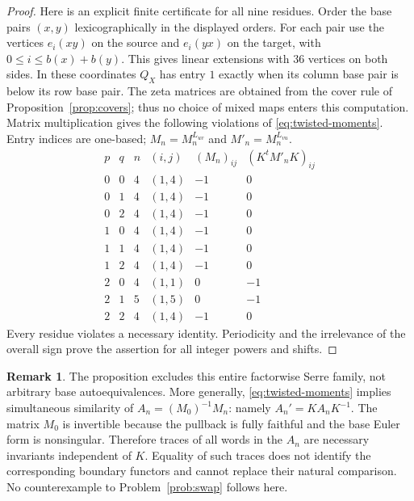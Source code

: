 \documentclass[11pt]{article}
\theoremstyle{definition}
\newtheorem{remark}[theorem]{Remark}
\begin{document}
\begin{proof}
Here is an explicit finite certificate for all nine residues.
Order the base pairs $(x,y)$ lexicographically in the displayed
orders. For each pair use the vertices $e_i(xy)$ on the source
and $e_i(yx)$ on the target, with
$0\leq i\leq b(x)+b(y)$. This gives linear extensions with $36$
vertices on both sides. In these coordinates $Q_X$ has entry $1$
exactly when its column base pair is below its row base pair.
The zeta matrices are obtained from the cover rule of
Proposition~\ref{prop:covers}; thus no choice of mixed maps enters
this computation. Matrix multiplication gives the following
violations of \eqref{eq:twisted-moments}. Entry indices are one-based;
$M_n=M_n^{L_{uv}}$ and $M'_n=M_n^{L_{vu}}$.
\[
\begin{array}{c|c|c|c|r|r}
 p&q&n&(i,j)&(M_n)_{ij}&(K^tM'_nK)_{ij}\\\hline
 0&0&4&(1,4)&-1&0\\
 0&1&4&(1,4)&-1&0\\
 0&2&4&(1,4)&-1&0\\
 1&0&4&(1,4)&-1&0\\
 1&1&4&(1,4)&-1&0\\
 1&2&4&(1,4)&-1&0\\
 2&0&4&(1,1)&0&-1\\
 2&1&5&(1,5)&0&-1\\
 2&2&4&(1,4)&-1&0
\end{array}
\]
Every residue violates a necessary identity. Periodicity and the
irrelevance of the overall sign prove the assertion for all
integer powers and shifts.
\end{proof}

\begin{remark}
The proposition excludes this entire factorwise Serre family,
not arbitrary base autoequivalences. More generally,
\eqref{eq:twisted-moments} implies simultaneous similarity of
$A_n=(M_0)^{-1}M_n$: namely $A_n'=KA_nK^{-1}$.
The matrix $M_0$ is invertible because the pullback is fully faithful
and the base Euler form is nonsingular. Therefore traces of all
words in the $A_n$ are necessary invariants independent of $K$.
Equality of such traces does not identify the corresponding
boundary functors and cannot replace their natural comparison.
No counterexample to Problem~\ref{prob:swap} follows here.
\end{remark}
\end{document}

